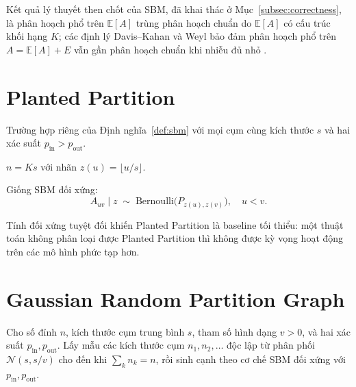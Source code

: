 Kết quả lý thuyết then chốt của SBM, đã khai thác ở Mục~\ref{subsec:correctness}, là phân hoạch phổ trên $\mathbb{E}[A]$ trùng phân hoạch chuẩn do $\mathbb{E}[A]$ có cấu trúc khối hạng $K$; các định lý Davis--Kahan và Weyl bảo đảm phân hoạch phổ trên $A = \mathbb{E}[A] + E$ vẫn gần phân hoạch chuẩn khi nhiễu đủ nhỏ \cite{lei2015, jin2015, su2017}.

\section{Planted Partition}
\label{appsec:planted}

\begin{definition}
\label{def:planted}
Trường hợp riêng của Định nghĩa~\ref{def:sbm} với mọi cụm cùng kích thước $s$ và hai xác suất $p_{\mathrm{in}} > p_{\mathrm{out}}$.
\end{definition}

\begin{description}[topsep=4pt, itemsep=2pt, leftmargin=2.4cm, style=nextline]
    \item[$\mathcal{D}_V$] $n = K s$ với nhãn $z(u) = \lfloor u / s \rfloor$.
    \item[$\mathcal{D}_E$] Giống SBM đối xứng:
    \[
        A_{uv} \mid z \;\sim\; \mathrm{Bernoulli}\bigl(P_{z(u), z(v)}\bigr), \quad u < v.
    \]
\end{description}

Tính đối xứng tuyệt đối khiến Planted Partition là baseline tối thiểu: một thuật toán không phân loại được Planted Partition thì không được kỳ vọng hoạt động trên các mô hình phức tạp hơn.

\section{Gaussian Random Partition Graph}
\label{appsec:grp}

\begin{definition}
\label{def:grp}
Cho số đỉnh $n$, kích thước cụm trung bình $s$, tham số hình dạng $v > 0$, và hai xác suất $p_{\mathrm{in}}, p_{\mathrm{out}}$. Lấy mẫu các kích thước cụm $n_1, n_2, \ldots$ độc lập từ phân phối $\mathcal{N}(s, s/v)$ cho đến khi $\sum_k n_k = n$, rồi sinh cạnh theo cơ chế SBM đối xứng với $p_{\mathrm{in}}, p_{\mathrm{out}}$.
\end{definition}

